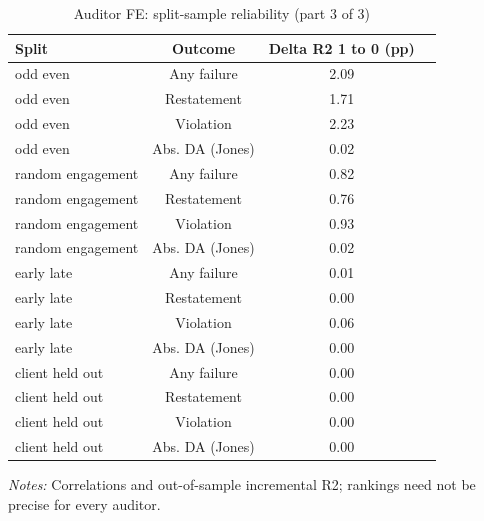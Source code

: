 \begin{table}[htbp]
\footnotesize
\centering
\caption{Auditor FE: split-sample reliability (part 3 of 3)}
\begin{threeparttable}
\begin{tabular}{p{}ccc}
\toprule
Split & Outcome & Delta R2 1 to 0 (pp) &  \\
\midrule
odd even & Any failure & 2.09 &  \\
odd even & Restatement & 1.71 &  \\
odd even & Violation & 2.23 &  \\
odd even & Abs. DA (Jones) & 0.02 &  \\
random engagement & Any failure & 0.82 &  \\
random engagement & Restatement & 0.76 &  \\
random engagement & Violation & 0.93 &  \\
random engagement & Abs. DA (Jones) & 0.02 &  \\
early late & Any failure & 0.01 &  \\
early late & Restatement & 0.00 &  \\
early late & Violation & 0.06 &  \\
early late & Abs. DA (Jones) & 0.00 &  \\
client held out & Any failure & 0.00 &  \\
client held out & Restatement & 0.00 &  \\
client held out & Violation & 0.00 &  \\
client held out & Abs. DA (Jones) & 0.00 &  \\
\bottomrule
\end{tabular}
\begin{tablenotes}\footnotesize
\item \raggedright \textit{Notes:} Correlations and out-of-sample incremental R2; rankings need not be precise for every auditor.
\end{tablenotes}
\end{threeparttable}
\end{table}
